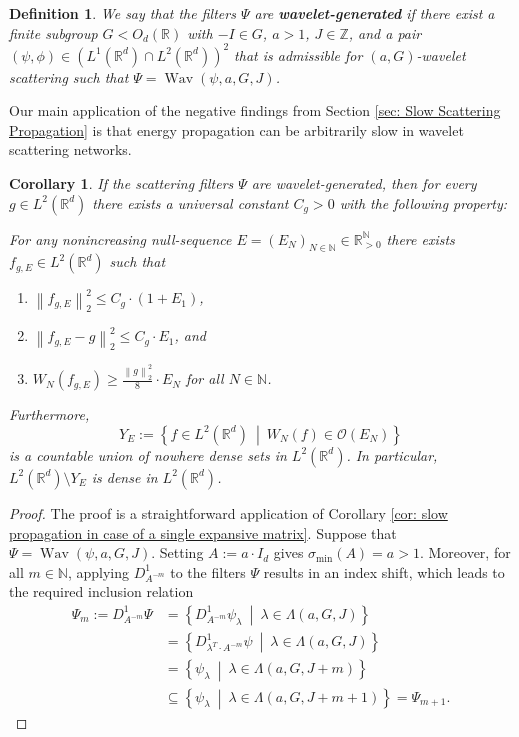 \documentclass[11pt]{amsart}
\newcommand{\R}{{\mathbb{R}}}
\newcommand{\N}{\mathbb{N}}
\newcommand{\Z}{\mathbb{Z}}
\newcommand{\norm}[1]{\ensuremath{\left\lVert\text{}#1\text{}\right\rVert}}
\newcommand{\set}[1]{\ensuremath{\left\{\text{}#1\text{}\right\}}}
\DeclareMathOperator{\Wav}{Wav}
\newtheorem{definition}[theorem]{Definition}
\newtheorem{corollary}[theorem]{Corollary}
\newenvironment{proof sketch} {\textit{Proof sketch.}}{}
\newenvironment{myenum}
{ \begin{enumerate}
    \setlength{\itemsep}{3pt}
    \setlength{\parskip}{0pt}
    \setlength{\parsep}{0pt}     }
{ \end{enumerate}                  }
\begin{document}
  
  \begin{definition}
    We say that the filters $\Psi$ are \textbf{wavelet-generated} if there exist a finite subgroup $G<O_d(\R)$ with $-I \in G$,  $a>1$, $J \in \Z$, and a pair $(\psi, \phi) \in \left(L^1(\R^d)\cap L^2(\R^d)\right)^2$ that is admissible for $(a,G)$-wavelet scattering such that $\Psi=\Wav(\psi,a,G,J)$. 
  \end{definition}
  
  Our main application of the negative findings from Section \ref{sec: Slow Scattering Propagation} is that energy propagation can be arbitrarily slow in wavelet scattering networks. 
  
  \begin{corollary}\label{cor: negative findings applied to wavelet scattering}
    If the scattering filters $\Psi$ are wavelet-generated, then for every $g \in L^2(\R^d)$ there exists a universal constant $C_g>0$ with the following property:
    
    For any nonincreasing null-sequence $E=(E_N)_{N \in \N}\in \R_{>0}^\N$ there exists $f_{g,E} \in L^2(\R^d)$ such that
    \begin{myenum}
      \item[a)] $\norm{f_{g,E}}_2^2\leq C_g \cdot (1+E_1)$,
      \item[b)] $\norm{f_{g,E}-g}_2^2\leq C_g \cdot E_1$, and
      \item[c)] $W_N(f_{g,E})\geq \frac{\norm{g}_2^2}{8} \cdot E_N$ for all $N\in \N$.
    \end{myenum}
    Furthermore,
    \[Y_E:=\left\{f \in L^2(\R^d) ~\middle|~ W_N(f) \in \mathcal{O}(E_N)\right\}\]
    is a countable union of nowhere dense sets in $L^2(\R^d)$. In particular, $L^2(\R^d) \setminus Y_E$ is dense in $L^2(\R^d)$.
  \end{corollary}
  
  \begin{proof}
    The proof is a straightforward application of Corollary \ref{cor: slow propagation in case of a single expansive matrix}. Suppose that $\Psi=\Wav(\psi,a,G,J)$. Setting $A:=a \cdot I_d$ gives $\sigma_{\min}(A)=a>1$. Moreover, for all $m \in \N$, applying $D_{A^{-m}}^1$ to the filters $\Psi$ results in an index shift, which leads to the required inclusion relation
    \begin{align*}
      \Psi_m:=D_{A^{-m}}^1\Psi&=\set{D_{A^{-m}}^1 \psi_\lambda ~\middle|~ \lambda \in \Lambda(a,G,J)}\\
      &=\set{D_{\lambda^T\cdot A^{-m}}^1 \psi ~\middle|~ \lambda \in \Lambda(a,G,J)}\\
      &=\set{\psi_\lambda ~\middle|~ \lambda \in \Lambda(a,G,J+m)}\\
      &\subseteq \set{\psi_\lambda ~\middle|~ \lambda \in \Lambda(a,G,J+m+1)} =\Psi_{m+1}.
    \end{align*}
  \end{proof}
  
\end{document}
